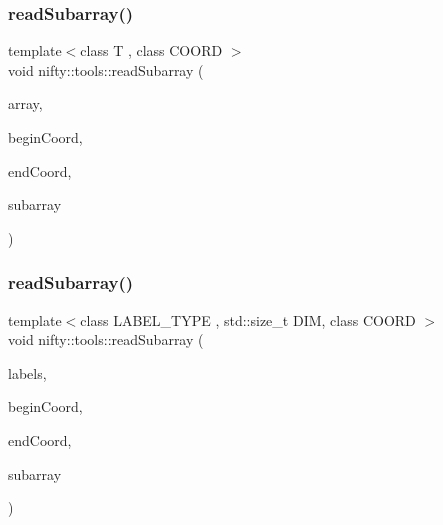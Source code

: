 \mbox{\label{namespacenifty_1_1tools_ab1a49786aa1d421ff8801c6659ada142}} 
\subsubsection{\texorpdfstring{read\+Subarray()}{readSubarray()}\hspace{0.1cm}{\footnotesize\ttfamily [1/4]}}
{\footnotesize\ttfamily template$<$class T , class C\+O\+O\+RD $>$ \\
void nifty\+::tools\+::read\+Subarray (\begin{DoxyParamCaption}\item[{const \hyperlink{classandres_1_1View}{marray\+::\+View}$<$ T $>$}]{array,  }\item[{const C\+O\+O\+RD \&}]{begin\+Coord,  }\item[{const C\+O\+O\+RD \&}]{end\+Coord,  }\item[{\hyperlink{classandres_1_1View}{marray\+::\+View}$<$ T $>$ \&}]{subarray }\end{DoxyParamCaption})\hspace{0.3cm}{\ttfamily [inline]}}

\mbox{\label{namespacenifty_1_1tools_a32fca5240a87f007e50dac403671cfa0}} 
\subsubsection{\texorpdfstring{read\+Subarray()}{readSubarray()}\hspace{0.1cm}{\footnotesize\ttfamily [2/4]}}
{\footnotesize\ttfamily template$<$class L\+A\+B\+E\+L\+\_\+\+T\+Y\+PE , std\+::size\+\_\+t D\+IM, class C\+O\+O\+RD $>$ \\
void nifty\+::tools\+::read\+Subarray (\begin{DoxyParamCaption}\item[{const \hyperlink{classnifty_1_1graph_1_1Hdf5Labels}{graph\+::\+Hdf5\+Labels}$<$ D\+IM, L\+A\+B\+E\+L\+\_\+\+T\+Y\+PE $>$ \&}]{labels,  }\item[{const C\+O\+O\+RD \&}]{begin\+Coord,  }\item[{const C\+O\+O\+RD \&}]{end\+Coord,  }\item[{\hyperlink{classandres_1_1View}{marray\+::\+View}$<$ L\+A\+B\+E\+L\+\_\+\+T\+Y\+PE $>$ \&}]{subarray }\end{DoxyParamCaption})\hspace{0.3cm}{\ttfamily [inline]}}

